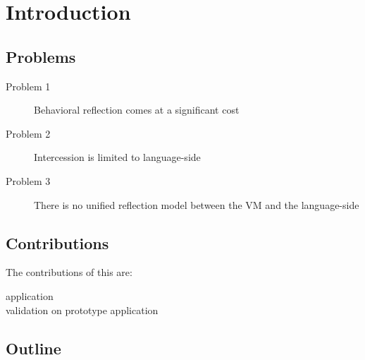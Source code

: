 
\chapter{Introduction}
\minitoc



\section{Problems}
\begin{description}
	\item[Problem 1] Behavioral reflection comes at a significant cost
	\item[Problem 2] Intercession is limited to language-side
	\item[Problem 3] There is no unified reflection model between the VM and the language-side
\end{description}
\section{Contributions}
The contributions of this are:

\begin{description}
	\item[\B]
	\item[\B application \FFI]
	\item[\B validation on prototype application]
\end{description}


\section{Outline}


\\

